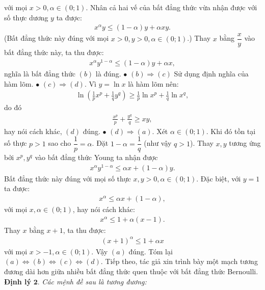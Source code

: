 \begin{multicols}{2}
		với mọi $ x>0,\alpha \in (0;1)$. Nhân cả hai vế của bất đẳng thức vừa nhận được với số thực dương $y$ ta được:
		\begin{align*}
			x^{\alpha}y \le (1-\alpha)y + \alpha xy.
		\end{align*}
		(Bất đẳng thức này đúng với mọi $x>0, y>0, \alpha \in (0;1)$.) Thay $x$ bằng $\dfrac{x}{y}$ vào bất đẳng thức này, ta thu được:
		\begin{align*}
			x^{\alpha}y^{1-\alpha} \le (1-\alpha)y + \alpha x,
		\end{align*}
		nghĩa là bất đẳng thức $(b)$ là đúng.
		\vskip 0.1cm
		$\bullet$ $(b) \Rightarrow (c)$ Sử dụng định nghĩa của hàm lõm.
		\vskip 0.1cm
		$\bullet$ $(c) \Rightarrow (d)$. Vì $y=\ln x$ là hàm lõm nên:
		\begin{align*}
			\ln \left( {\frac{1}{p}{x^p} + \frac{1}{q}{y^q}} \right) \ge   \frac{1}{p}\ln {x^p} + \frac{1}{q}\ln {x^q},
		\end{align*}
		do đó
		\begin{align*}
			\frac{{{x^p}}}{p} + \frac{{{y^q}}}{q} \ge xy,
		\end{align*}
		hay nói cách khác, $(d)$ đúng.
		\vskip 0.1cm
		$\bullet$ $(d) \Rightarrow (a)$. Xét $\alpha \in (0;1)$. Khi đó tồn tại số thực $p>1$ sao cho $\dfrac{1}{p}=\alpha$. Đặt $1-\alpha=\dfrac{1}{q}$ (như vậy $q>1$). Thay $x, y$ tương ứng bởi $x^p, y^q$ vào bất đẳng thức Young ta nhận được
		\begin{align*}
			x^{\alpha}y^{1-\alpha} \le \alpha x + (1-\alpha)y.
		\end{align*}
		Bất đẳng thức này đúng với mọi số thực $ x,y>0,\alpha \in (0;1)$. Đặc biệt, với $y=1$ ta được:
		\begin{align*}
			x^{\alpha} \le \alpha x + (1-\alpha),
		\end{align*}
		với mọi $x,\alpha \in (0;1)$, hay nói cách khác:
		\begin{align*}
			x^{\alpha} \le 1+\alpha (x-1).
		\end{align*}
		Thay $x$ bằng $x+1$, ta thu được:
		\begin{align*}
			(x+1)^{\alpha} \le 1+\alpha x
		\end{align*}
		với mọi $x>-1,\alpha \in (0;1)$. Vậy $(a)$ đúng.
		\vskip 0.1cm
		Tóm lại
			$(a) \Leftrightarrow (b) \Leftrightarrow (c) \Leftrightarrow (d).$
		\vskip 0.1cm
		Tiếp theo, tác giả xin trình bày một mạch tương đương dài hơn giữa nhiều bất đẳng thức quen thuộc với bất đẳng thức Bernoulli.
		\vskip 0.1cm
		\textbf{\color{hoccungpi}Định lý} $\pmb{2.}$
		\textit{Các mệnh đề sau là tương đương:
}
\end{multicols}
